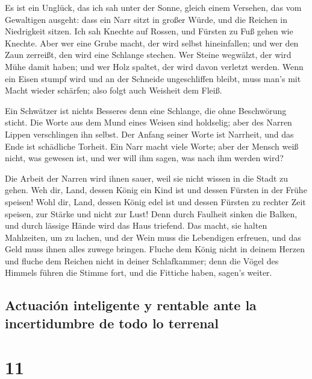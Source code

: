  Es ist ein Unglück, das ich sah unter der Sonne, gleich
einem Versehen, das vom Gewaltigen ausgeht:  dass ein Narr
sitzt in großer Würde, und die Reichen in Niedrigkeit sitzen.
 Ich sah Knechte auf Rossen, und Fürsten zu Fuß gehen wie
Knechte.  Aber wer eine Grube macht, der wird selbst
hineinfallen; und wer den Zaun zerreißt, den wird eine Schlange stechen.
 Wer Steine wegwälzt, der wird Mühe damit haben; und wer
Holz spaltet, der wird davon verletzt werden.  Wenn ein
Eisen stumpf wird und an der Schneide ungeschliffen bleibt, muss man's
mit Macht wieder schärfen; also folgt auch Weisheit dem Fleiß.

 Ein Schwätzer ist nichts Besseres denn eine Schlange,
die ohne Beschwörung sticht.  Die Worte aus dem Mund
eines Weisen sind holdselig; aber des Narren Lippen verschlingen ihn
selbst.  Der Anfang seiner Worte ist Narrheit, und das
Ende ist schädliche Torheit.  Ein Narr macht viele Worte;
aber der Mensch weiß nicht, was gewesen ist, und wer will ihm sagen, was
nach ihm werden wird?

 Die Arbeit der Narren wird ihnen sauer, weil sie nicht
wissen in die Stadt zu gehen.  Weh dir, Land, dessen
König ein Kind ist und dessen Fürsten in der Frühe speisen!
 Wohl dir, Land, dessen König edel ist und dessen Fürsten
zu rechter Zeit speisen, zur Stärke und nicht zur Lust! 
Denn durch Faulheit sinken die Balken, und durch lässige Hände wird das
Haus triefend.  Das macht, sie halten Mahlzeiten, um zu
lachen, und der Wein muss die Lebendigen erfreuen, und das Geld muss
ihnen alles zuwege bringen.  Fluche dem König nicht in
deinem Herzen und fluche dem Reichen nicht in deiner Schlafkammer; denn
die Vögel des Himmels führen die Stimme fort, und die Fittiche haben,
sagen's weiter.

\hypertarget{actuaciuxf3n-inteligente-y-rentable-ante-la-incertidumbre-de-todo-lo-terrenal}{%
\subsection{Actuación inteligente y rentable ante la incertidumbre de
todo lo
terrenal}\label{actuaciuxf3n-inteligente-y-rentable-ante-la-incertidumbre-de-todo-lo-terrenal}}

\hypertarget{section-10}{%
\section{11}\label{section-10}}

